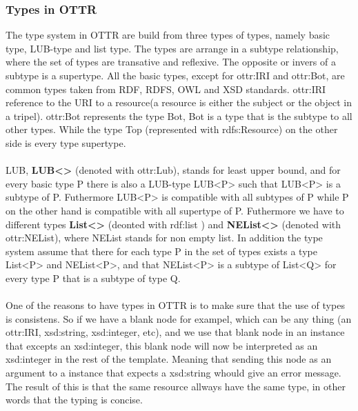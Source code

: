 \subsubsection{Types in OTTR}
The type system in OTTR are build from three types of types, namely basic type, LUB-type and list type. The types are arrange in 
a subtype relationship, where the set of types are transative and reflexive. The opposite or invers of a subtype is a supertype.
All the basic types, except for ottr:IRI and ottr:Bot, are common types taken from RDF, RDFS, OWL and XSD standards. ottr:IRI reference 
to the URI to a resource(a resource is either the subject or the object in a tripel). ottr:Bot represents the type Bot, Bot is a type that 
is the subtype to all other types. While the type Top (represented with rdfs:Resource) on the other side is every type supertype.
\\ \\
LUB, \textbf{LUB<>} (denoted with ottr:Lub), stands for least upper bound, and for every basic type P there is also a LUB-type LUB<P> such that LUB<P> is 
a subtype of P. Futhermore LUB<P> is compatible with all subtypes of P while P on the other hand is compatible with all supertype of P. 
Futhermore we have to different types \textbf{List<>} (deonted with rdf:list ) and \textbf{NEList<>} (denoted with ottr:NEList), where 
NEList stands for non empty list. In addition the 
type system assume that there for each type P in the set of types exists a type List<P> and NEList<P>, and that 
NEList<P> is a subtype of List<Q> for every type P that is a subtype of type Q.
\\ \\
One of the reasons to have types in OTTR is to make sure that the use of types is consistens. So
if we have a blank node for exampel, which can be any thing (an ottr:IRI, xsd:string, xsd:integer, etc), and we use that blank node 
in an instance that excepts an xsd:integer, this blank node will now be interpreted as an xsd:integer in the rest of the template. 
Meaning that sending this node as an argument to a instance that expects a xsd:string whould give an error message. The result of this 
is that the same resource allways have the same type, in other words that the typing is concise. 
